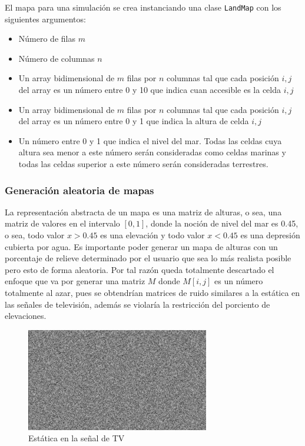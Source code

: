 El mapa para una simulaci\'on se crea instanciando una clase \verb|LandMap| con los siguientes argumentos:

\begin{itemize}
	\item N\'umero de filas $m$
	\item N\'umero de columnas $n$
	\item Un array bidimensional de $m$ filas por $n$ columnas tal que cada posici\'on $i,j$ del array es un n\'umero entre 0 y 10 que indica cuan accesible es la celda $i,j$
	\item Un array bidimensional de $m$ filas por $n$ columnas tal que cada posici\'on $i,j$ del array es un n\'umero entre 0 y 1 que indica la altura de celda $i,j$
	\item Un n\'umero entre 0 y 1 que indica el nivel del mar. Todas las celdas cuya altura sea menor a este n\'umero ser\'an consideradas como celdas marinas y todas las celdas superior a este n\'umero ser\'an consideradas terrestres.
\end{itemize}

\subsubsection{Generación aleatoria de mapas}

La representación abstracta de un mapa es una matriz de alturas, o sea, una matriz de valores en el intervalo $[0,1]$, donde la noción de nivel del mar es 0.45, o sea, todo valor $x > 0.45$ es una elevación y todo valor $x < 0.45$ es una depresión cubierta por agua. Es importante poder generar un mapa de alturas con un porcentaje de relieve determinado por el usuario que sea lo más realista posible pero esto de forma aleatoria. Por tal razón queda totalmente descartado el enfoque que va por generar una matriz $M$ donde $M[i,j]$ es un número totalmente al azar, pues se obtendrían matrices de ruido similares a la estática en las señales de televisión, además se violaría la restricción del porciento de elevaciones.

\begin{figure}
	\centering
	\includegraphics[width=8cm]{chapters/img/estatica.jpg}
	\caption{Estática en la señal de TV}
\end{figure}

